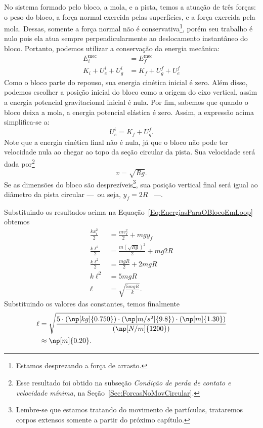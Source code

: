 No sistema formado pelo bloco, a mola, e a pista, temos a atuação de três forças: o peso do bloco, a força normal exercida pelas superfícies, e a força exercida pela mola. Dessas, somente a força normal não é conservativa\footnote{Estamos desprezando a força de arrasto.}, porém seu trabalho é nulo pois ela atua sempre perpendicularmente ao deslocamento instantâneo do bloco. Portanto, podemos utilizar a conservação da energia mecânica:
\begin{align}
    E_i^{\textrm{mec}} &= E_f^{\textrm{mec}} \\
    K_i + U_e^i + U_g^i &= K_f + U_g^f + U_e^f
\end{align}
%
Como o bloco parte do repouso, sua energia cinética inicial é zero. Além disso, podemos escolher a posição inicial do bloco como a origem do eixo vertical, assim a energia potencial gravitacional inicial é nula. Por fim, sabemos que quando o bloco deixa a mola, a energia potencial elástica é zero. Assim, a expressão acima simplifica-se a:
\begin{equation}\label{Eq:EnergiasParaOBlocoEmLoop}
    U_e^i = K_f + U_g^f.
\end{equation}
%
Note que a energia cinética final não é nula, já que o bloco não pode ter velocidade nula ao chegar ao topo da seção circular da pista. Sua velocidade será dada por\footnote{Esse resultado foi obtido na subseção \emph{Condição de perda de contato e velocidade mínima}, na Seção~\ref{Sec:ForcasNoMovCircular}.}
\begin{equation}
    v = \sqrt{Rg}.
\end{equation}
%
Se as dimensões do bloco são desprezíveis\footnote{Lembre-se que estamos tratando do movimento de partículas, trataremos corpos extensos somente a partir do próximo capítulo.}, sua posição vertical final será igual ao diâmetro da pista circular ---~ou seja, $y_f = 2R$ ~---.

Substituindo os resultados acima na Equação~\ref{Eq:EnergiasParaOBlocoEmLoop} obtemos
\begin{align}
    \frac{kx_i^2}{2} &= \frac{mv_f^2}{2} + mgy_f \\
    \frac{k\ell^2}{2} &= \frac{m(\sqrt{Rg})^2}{2} + mg2R \\
    \frac{k\ell^2}{2} &= \frac{mgR}{2} + 2mgR \\
    k\ell^2 &= 5mgR \\
    \ell &= \sqrt{\frac{5mgR}{k}}.
\end{align}
%
Substituindo os valores das constantes, temos finalmente
\begin{align}
    \ell &= \sqrt{\frac{5\cdot(\np[kg]{0.750}) \cdot (\np[m/s^2]{9.8}) \cdot (\np[m]{1.30}) }{(\np[N/m]{1200})}} \\
    &\approx \np[m]{0.20}.
\end{align}


